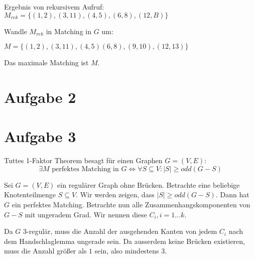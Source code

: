 \documentclass[a4paper]{article}
\begin{document}
\parbox[b]{0.45\textwidth}{
Ergebnis von rekursivem Aufruf: \\
$M_{rek} = \{ (1,2), (3,11), (4,5), (6,8), (12, B)\}$

Wandle $M_{rek}$ in Matching in $G$ um:

$M = \{ (1, 2), (3, 11), (4,5) (6, 8), (9, 10), (12, 13) \}$

Das maximale Matching ist $M$. \\
}


\section{Aufgabe 2}

\section{Aufgabe 3}
Tuttes 1-Faktor Theorem besagt für einen Graphen $G = (V, E)$:
\[
	\exists M \text{ perfektes Matching in } G \Leftrightarrow
	\forall S \subseteq V: |S| \geq odd(G - S)
\]

Sei $G = (V, E)$ ein regulärer Graph ohne Brücken.
Betrachte eine beliebige Knotenteilmenge $S \subseteq V$.
Wir werden zeigen, dass $|S| \geq odd(G - S)$. Dann hat $G$ ein perfektes
Matching.
Betrachte nun alle Zusammenhangskomponenten von $G - S$ mit ungeradem Grad.
Wir nennen diese $C_i, i = 1 ... k$.

Da $G$ 3-regulär, muss die Anzahl der ausgehenden Kanten von jedem $C_i$
nach dem Handschlaglemma ungerade sein. Da ausserdem keine Brücken
existieren, muss die Anzahl größer als $1$ sein, also mindestens $3$.
\end{document}
